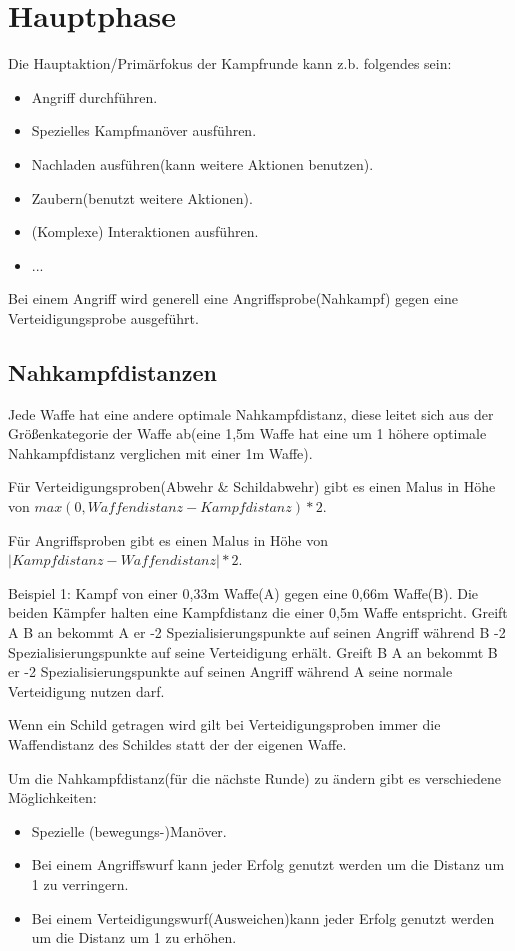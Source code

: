 \section{Hauptphase}
Die Hauptaktion/Primärfokus der Kampfrunde kann z.b. folgendes sein:
\begin{itemize}
\item Angriff durchführen.
\item Spezielles Kampfmanöver ausführen.
\item Nachladen ausführen(kann weitere Aktionen benutzen).
\item Zaubern(benutzt weitere Aktionen).
\item (Komplexe) Interaktionen ausführen.
\item ...
\end{itemize}
Bei einem Angriff wird generell eine Angriffsprobe(Nahkampf) gegen eine Verteidigungsprobe ausgeführt.

\subsection{Nahkampfdistanzen}
Jede Waffe hat eine andere optimale Nahkampfdistanz, diese leitet sich aus der Größenkategorie der Waffe ab(eine 1,5m Waffe hat eine um 1 höhere optimale Nahkampfdistanz verglichen mit einer 1m Waffe).

Für Verteidigungsproben(Abwehr \& Schildabwehr) gibt es einen Malus in Höhe von $max(0,Waffendistanz-Kampfdistanz)*2$.

Für Angriffsproben gibt es einen Malus in Höhe von $|Kampfdistanz-Waffendistanz|*2$.

Beispiel 1: Kampf von einer 0,33m Waffe(A) gegen eine 0,66m Waffe(B). Die beiden Kämpfer halten eine Kampfdistanz die einer 0,5m Waffe entspricht.
Greift A B an bekommt A er -2 Spezialisierungspunkte auf seinen Angriff während B -2 Spezialisierungspunkte auf seine Verteidigung erhält.
Greift B A an bekommt B er -2 Spezialisierungspunkte auf seinen Angriff während A seine normale Verteidigung nutzen darf.

Wenn ein Schild getragen wird gilt bei Verteidigungsproben immer die Waffendistanz des Schildes statt der der eigenen Waffe.

Um die Nahkampfdistanz(für die nächste Runde) zu ändern gibt es verschiedene Möglichkeiten:
\begin{itemize}
\item Spezielle (bewegungs-)Manöver.
\item Bei einem Angriffswurf kann jeder Erfolg genutzt werden um die Distanz um 1 zu verringern.
\item Bei einem Verteidigungswurf(Ausweichen)kann jeder Erfolg genutzt werden um die Distanz um 1 zu erhöhen.
\end{itemize}

